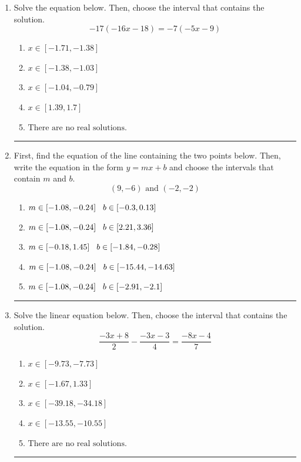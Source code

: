 \documentclass[14pt]{extbook}
\newcommand{\litem}[1]{\item#1\hspace*{-1cm}\rule{\textwidth}{0.4pt}}
\begin{document}
\begin{enumerate}
{\begin{enumerate}[label=\Alph*.]
\end{enumerate} }
\litem{
Solve the equation below. Then, choose the interval that contains the solution.\[ -17(-16x -18) = -7(-5x -9) \]\begin{enumerate}[label=\Alph*.]
\item \( x \in [-1.71, -1.38] \)
\item \( x \in [-1.38, -1.03] \)
\item \( x \in [-1.04, -0.79] \)
\item \( x \in [1.39, 1.7] \)
\item \( \text{There are no real solutions.} \)

\end{enumerate} }
\litem{
First, find the equation of the line containing the two points below. Then, write the equation in the form $ y=mx+b $ and choose the intervals that contain $m$ and $b$.\[ (9, -6) \text{ and } (-2, -2) \]\begin{enumerate}[label=\Alph*.]
\item \( m \in [-1.08, -0.24] \hspace*{3mm} b \in [-0.3, 0.13] \)
\item \( m \in [-1.08, -0.24] \hspace*{3mm} b \in [2.21, 3.36] \)
\item \( m \in [-0.18, 1.45] \hspace*{3mm} b \in [-1.84, -0.28] \)
\item \( m \in [-1.08, -0.24] \hspace*{3mm} b \in [-15.44, -14.63] \)
\item \( m \in [-1.08, -0.24] \hspace*{3mm} b \in [-2.91, -2.1] \)

\end{enumerate} }
\litem{
Solve the linear equation below. Then, choose the interval that contains the solution.\[ \frac{-3x + 8}{2} - \frac{-3x -3}{4} = \frac{-8x -4}{7} \]\begin{enumerate}[label=\Alph*.]
\item \( x \in [-9.73, -7.73] \)
\item \( x \in [-1.67, 1.33] \)
\item \( x \in [-39.18, -34.18] \)
\item \( x \in [-13.55, -10.55] \)
\item \( \text{There are no real solutions.} \)


\end{enumerate}}
\end{enumerate}
\end{document}
